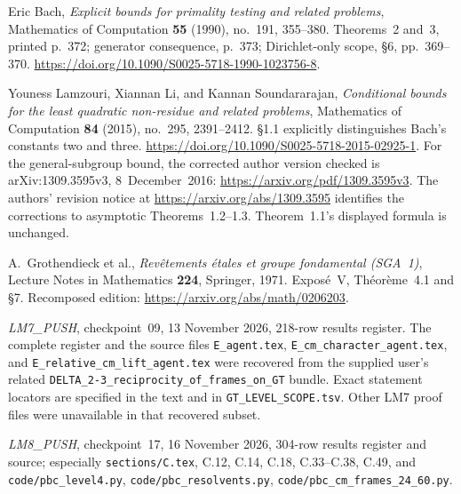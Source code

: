 Eric Bach, \emph{Explicit bounds for primality testing and related problems},
Mathematics of Computation \textbf{55} (1990), no.~191, 355--380.
Theorems~2 and~3, printed p.~372; generator consequence, p.~373;
Dirichlet-only scope, \S6, pp.~369--370.
\url{https://doi.org/10.1090/S0025-5718-1990-1023756-8}.

Youness Lamzouri, Xiannan Li, and Kannan Soundararajan,
\emph{Conditional bounds for the least quadratic non-residue and related problems},
Mathematics of Computation \textbf{84} (2015), no.~295, 2391--2412.
\S1.1 explicitly distinguishes Bach's constants two and three.
\url{https://doi.org/10.1090/S0025-5718-2015-02925-1}.
For the general-subgroup bound, the corrected author version checked
is arXiv:1309.3595v3, 8~December~2016:
\url{https://arxiv.org/pdf/1309.3595v3}.
The authors' revision notice at
\url{https://arxiv.org/abs/1309.3595} identifies the corrections to
asymptotic Theorems~1.2--1.3. Theorem~1.1's displayed formula is unchanged.

A.~Grothendieck et al., \emph{Rev\^etements \'etales et groupe fondamental
(SGA~1)}, Lecture Notes in Mathematics \textbf{224}, Springer, 1971.
Expos\'e~V, Th\'eor\`eme~4.1 and \S7.
Recomposed edition: \url{https://arxiv.org/abs/math/0206203}.

\emph{LM7\_PUSH}, checkpoint~09, 13 November 2026,
218-row results register. The complete register and the source files
\texttt{E\_agent.tex}, \texttt{E\_cm\_character\_agent.tex}, and
\texttt{E\_relative\_cm\_lift\_agent.tex} were recovered from the
supplied user's related \texttt{DELTA\_2-3\_reciprocity\_of\_frames\_on\_GT}
bundle. Exact statement locators are specified in the text and in
\texttt{GT\_LEVEL\_SCOPE.tsv}. Other LM7 proof files were unavailable
in that recovered subset.

\emph{LM8\_PUSH}, checkpoint~17, 16 November 2026,
304-row results register and source; especially
\texttt{sections/C.tex}, C.12, C.14, C.18, C.33--C.38, C.49,
and \texttt{code/pbc\_level4.py}, \texttt{code/pbc\_resolvents.py},
\texttt{code/pbc\_cm\_frames\_24\_60.py}.
